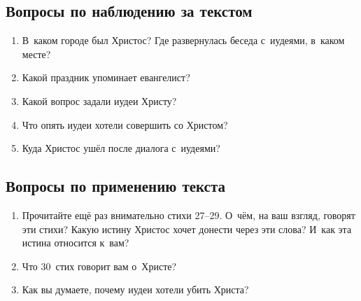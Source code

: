 \documentclass[a4paper,12pt]{article}
\begin{document}
\subsection*{Вопросы по наблюдению за текстом}
\begin{enumerate}
    \item В~каком городе был Христос? Где развернулась беседа с~иудеями, в~каком месте? 
    
    \myline
    
    \myline
    \item Какой праздник упоминает евангелист? 
    
    \myline
    
    \myline
    \item Какой вопрос задали иудеи Христу? 
    
    \myline
    
    \myline
    \item Что опять иудеи хотели совершить со Христом? 
    
    \myline
    
    \myline
    \item Куда Христос ушёл после диалога с~иудеями? 
    
    \myline
    
    \myline
\end{enumerate}

\subsection*{Вопросы по применению текста} 
\begin{enumerate}
    \item Прочитайте ещё раз внимательно стихи 27--29. О~чём, на ваш взгляд, говорят эти стихи? Какую истину Христос хочет донести через эти слова? И~как эта истина относится к~вам?
    
    \myline
    
    \myline

    \myline    
    \item Что 30~стих говорит вам о~Христе? 
    
    \myline
    
    \myline
    \item Как вы думаете, почему иудеи хотели убить Христа?
    
    \myline
    
    \myline
\end{enumerate}


\end{document}
